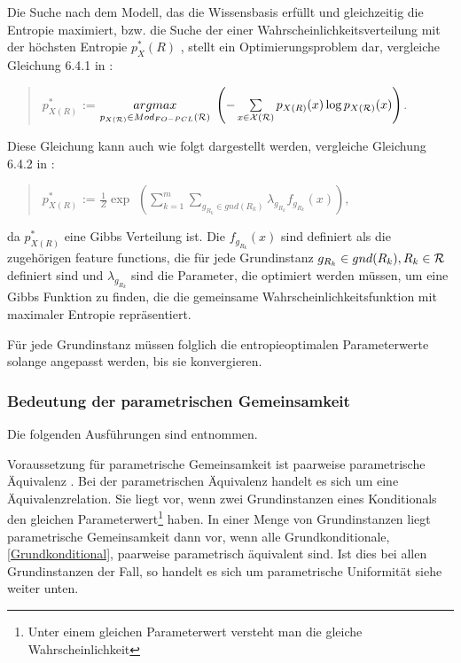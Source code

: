 \documentclass[a4paper, 11pt]{book}
\begin{document}
Die Suche nach dem Modell, das die Wissensbasis erfüllt und gleichzeitig die Entropie maximiert, bzw. die Suche der einer Wahrscheinlichkeitsverteilung mit der höchsten Entropie $ p^*_X(R) $ , stellt ein Optimierungsproblem dar, vergleiche Gleichung 6.4.1 in \cite{Fis10}:
\begin{quote}
$ p^{*}_{X(R)} $ := $ \underset{p_{X(\cal{R})}\in Mod_{FO-PCL}(\cal{R})}{argmax} $
$ \left(- \sum\limits_{x \in \cal{X(R)}}p_{X(R)}(x)\log p_{X(\cal{R})} (x)\right) $$ $.\\
\end{quote}
Diese Gleichung kann auch wie folgt dargestellt werden, vergleiche Gleichung 6.4.2 in \cite{Fis10}:
\begin{quote}
$ p^{*}_{X(R)} $ := $ \frac{1}{Z} \exp $
$ \left(\sum\limits_{k=1}^{m} \sum\limits_{g_{R_{k}} \in gnd(R_{k})} \lambda_{g_{R_{k}}} f_{g_{R_{k}}}(x)\right) $$ $,\\
\end{quote}
da $ p^{*}_{X(R)} $ eine Gibbs Verteilung ist. Die $ f_{g_{R_{k}}}(x) $ sind definiert als die zugehörigen feature functions, die für jede Grundinstanz $ g_{R_{k}} \in gnd(R_{k}), R_{k} \in \cal{R} $ definiert sind und $ \lambda_{g_{R_{k}}}  $ sind die Parameter, die optimiert werden müssen, um eine Gibbs Funktion zu finden, die die gemeinsame Wahrscheinlichkeitsfunktion mit maximaler Entropie repräsentiert.

Für jede Grundinstanz müssen folglich die entropieoptimalen Parameterwerte solange angepasst werden, bis sie konvergieren. 

\subsubsection{Bedeutung der parametrischen Gemeinsamkeit}  
\label{sec:parÄ}
Die folgenden Ausführungen sind \cite[Kap. 7.1, S. 148ff]{Fis10} entnommen.

Voraussetzung für parametrische Gemeinsamkeit ist paarweise parametrische Äquivalenz . Bei der parametrischen Äquivalenz  handelt es sich um eine Äquivalenzrelation. Sie liegt vor, wenn zwei Grundinstanzen  eines Konditionals  den gleichen Parameterwert\footnote{Unter einem gleichen Parameterwert versteht man die gleiche Wahrscheinlichkeit} haben. In einer Menge von Grundinstanzen liegt parametrische Gemeinsamkeit dann vor, wenn alle Grundkonditionale, \ref{Grundkonditional},  paarweise parametrisch äquivalent sind. Ist dies bei allen Grundinstanzen der Fall, so handelt es sich um parametrische Uniformität siehe weiter unten.
\end{document}
